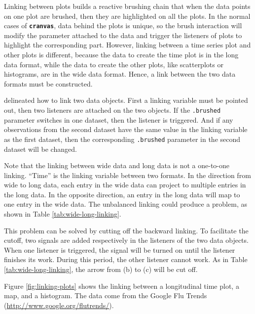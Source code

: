 \documentclass[12pt]{article}
\begin{document}
Linking between plots builds a reactive brushing chain that
when the data points on one plot are brushed, then they are
highlighted on all the plots. In the normal cases of
\texttt{\textbf{cranvas}}, data behind the plots is unique,
so the brush interaction will modify the parameter attached
to the data and trigger the listeners of plots to highlight
the corresponding part. However, linking between a time
series plot and other plots is different, because the
data to create the time plot is in the long data format,
while the data to create the other plots, like scatterplots
or histograms, are in the wide data format. Hence, a link
between the two data formats must be constructed.

\citet{xie2014reactive} delineated how to link two data
objects. First a linking variable must be pointed out, then two listeners
are attached on the two objects. If the \texttt{.brushed} parameter
switches in one dataset, then the listener is triggered. And if any
observations from the second dataset have the same value in the linking
variable as the first dataset, then the corresponding \texttt{.brushed}
parameter in the second dataset will be changed. 

Note that the linking between wide data and long data is not a one-to-one
linking. ``Time'' is the linking variable between two formats.
In the direction from wide to long data, each entry in the
wide data can project to multiple entries in the long data. In the
opposite direction, an entry in the long data will map to one entry in
the wide data. The unbalanced linking could produce a problem, as
shown in Table \ref{tab:wide-long-linking}.

This problem can be solved by cutting off the backward linking.
To facilitate the cutoff, two signals are added respectively
in the listeners of the two data objects. When one listener
is triggered, the signal will be turned on until the listener
finishes its work. During this period, the other listener cannot work.
As in Table \ref{tab:wide-long-linking}, the arrow from  (b) to  (c)
will be cut off.

Figure \ref{fig:linking-plots} shows the linking between
a longitudinal time plot, a map, and a histogram. The data
come from the Google Flu Trends
(\url{http://www.google.org/flutrends/}).
\end{document}
